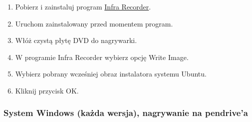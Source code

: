 \begin{enumerate}[label=\protect\circled{\arabic*}]
\item Pobierz i zainstaluj program \href{http://infrarecorder.org/?page_id=5}{Infra Recorder}.
\item Uruchom zainstalowany przed momentem program.
\item Włóż czystą płytę DVD do nagrywarki.
\item W programie Infra Recorder wybierz opcję \textcolor{ubuntu_orange}{Write Image}.
\item Wybierz pobrany wcześniej obraz instalatora systemu Ubuntu.
\item Kliknij przycisk \textcolor{ubuntu_orange}{OK}.
\end{enumerate}
\clearpage
\subsubsection{System Windows (każda wersja), nagrywanie na pendrive'a}
